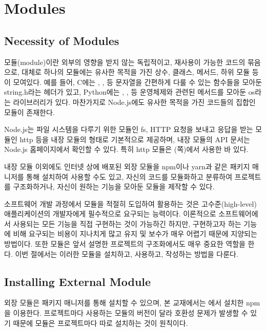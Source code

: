\section{Modules}\label{sect:modules}

\subsection*{Necessity of Modules}

모듈(module)이란 외부의 영향을 받지 않는 독립적이고, 재사용이 가능한 코드의 묶음으로, 대체로 하나의 모듈에는 유사한 목적을 가진 상수, 클래스, 메서드, 하위 모듈 등이 모여있다. 예를 들어, C에는 , ,  등 문자열을 간편하게 다룰 수 있는 함수들을 모아둔 string.h라는 헤더가 있고, Python에는 , ,  등 운영체제와 관련된 메서드를 모아둔 os라는 라이브러리가 있다. 마찬가지로 Node.js에도 유사한 목적을 가진 코드들의 집합인 모듈이 존재한다.

Node.js는 파일 시스템을 다루기 위한 모듈인 fs, HTTP 요청을 보내고 응답을 받는 모듈인 http 등을 내장 모듈의 형태로 기본적으로 제공하며, 내장 모듈의 API 문서는 Node.js 홈페이지에서 확인할 수 있다. 특히 http 모듈은 (\pageref{code:nodejs-simple-web-server}쪽)에서 사용한 바 있다.

내장 모듈 이외에도 인터넷 상에 배포된 외장 모듈을 npm이나 yarn과 같은 패키지 매니저를 통해 설치하여 사용할 수도 있고, 자신의 코드를 모듈화하고 분류하여 프로젝트를 구조화하거나, 자신이 원하는 기능을 모아둔 모듈을 제작할 수 있다.

소프트웨어 개발 과정에서 모듈을 적절히 도입하여 활용하는 것은 고수준(high-level) 애플리케이션의 개발자에게 필수적으로 요구되는 능력이다. 이론적으로 소프트웨어에서 사용되는 모든 기능을 직접 구현하는 것이 가능하긴 하지만, 구현하고자 하는 기능에 비해 요구되는 비용이 지나치게 많고 유지 및 보수가 매우 어렵기 때문에 지양되는 방법이다. 또한 모듈은 앞서 설명한 프로젝트의 구조화에서도 매우 중요한 역할을 한다. 이번 절에서는 이러한 모듈을 설치하고, 사용하고, 작성하는 방법을 다룬다.

\subsection*{Installing External Module}

외장 모듈은 패키지 매니저를 통해 설치할 수 있으며, 본 교재에서는 에서 설치한 npm을 이용한다. 프로젝트마다 사용하는 모듈의 버전이 달라 호환성 문제가 발생할 수 있기 때문에 모듈은 프로젝트마다 따로 설치하는 것이 원칙이다.

